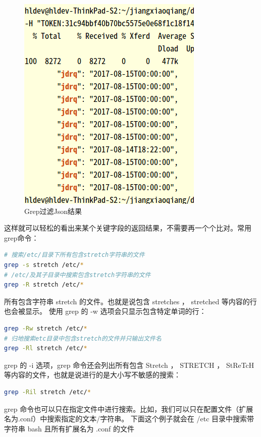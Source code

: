 \documentclass[12pt]{book}
\numberwithin{dummy}{section}
\theoremstyle{ocrenumbox}
\theoremstyle{blacknumex}
\theoremstyle{blacknumbox}
\theoremstyle{ocrenum}
\begin{document}
\begin{figure}[htbp]
	\centering
	\includegraphics[scale=0.5]{grepfilterreturnvalue.png}
	\caption{Grep过滤Json结果}
	\label{fig:grepfilterreturnvalue}
\end{figure}

这样就可以轻松的看出来某个关键字段的返回结果，不需要再一个个比对。常用grep命令：

\begin{lstlisting}[language=Bash]
# 搜索/etc/目录下所有包含stretch字符串的文件
grep -s stretch /etc/*
# /etc/及其子目录中搜索包含stretch字符串的文件
grep -R stretch /etc/*
\end{lstlisting}

所有包含字符串 stretch 的文件。也就是说包含 stretches ， stretched 等内容的行也会被显示。 使用 grep 的 -w 选项会只显示包含特定单词的行：

\begin{lstlisting}[language=Bash]
grep -Rw stretch /etc/*
# 归地搜索etc目录中包含stretch的文件并只输出文件名
grep -Rl stretch /etc/*
\end{lstlisting}

grep 的 -i 选项，grep 命令还会列出所有包含 Stretch ， STRETCH ， StReTcH 等内容的文件，也就是说进行的是大小写不敏感的搜索：

\begin{lstlisting}[language=Bash]
grep -Ril stretch /etc/*
\end{lstlisting}

grep 命令也可以只在指定文件中进行搜索。比如，我们可以只在配置文件（扩展名为.conf）中搜索指定的文本/字符串。 下面这个例子就会在 /etc 目录中搜索带字符串 bash 且所有扩展名为 .conf 的文件
\end{document}
